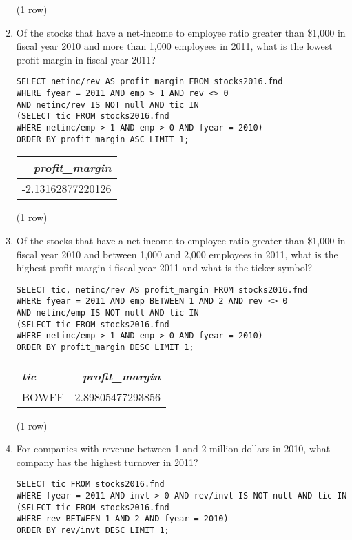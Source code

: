 \documentclass[]{article}
\newenvironment{question}[2][Question]{\begin{trivlist}
\item[\hskip \labelsep {\bfseries #1}\hskip \labelsep {\bfseries #2.}]}{\end{trivlist}}
\begin{document}
\begin{question}{2}
\begin{enumerate}[label=(\alph*)]
\begin{center}
\noindent (1 row) \\
\end{center}

\item Of the stocks that have a net-income to employee ratio greater than \$1,000 in fiscal year 2010 and more than 1,000 employees in 2011, what is the lowest profit margin in fiscal year 2011?
  \color{blue}
\begin{verbatim}
SELECT netinc/rev AS profit_margin FROM stocks2016.fnd
WHERE fyear = 2011 AND emp > 1 AND rev <> 0
AND netinc/rev IS NOT null AND tic IN
(SELECT tic FROM stocks2016.fnd
WHERE netinc/emp > 1 AND emp > 0 AND fyear = 2010)
ORDER BY profit_margin ASC LIMIT 1;
  \end{verbatim}
\color{black}

\begin{center}
\begin{tabular}{r}
\textit{profit\_margin} \\
\hline
-2.13162877220126 \\
\end{tabular}

\noindent (1 row) \\
\end{center}

\item Of the stocks that have a net-income to employee ratio greater than \$1,000 in fiscal year 2010 and between 1,000 and 2,000 employees in 2011, what is the highest profit margin i fiscal year 2011 and what is the ticker symbol?
  \color{blue}
\begin{verbatim}
SELECT tic, netinc/rev AS profit_margin FROM stocks2016.fnd
WHERE fyear = 2011 AND emp BETWEEN 1 AND 2 AND rev <> 0
AND netinc/emp IS NOT null AND tic IN
(SELECT tic FROM stocks2016.fnd
WHERE netinc/emp > 1 AND emp > 0 AND fyear = 2010)
ORDER BY profit_margin DESC LIMIT 1;
  \end{verbatim}
\color{black}

\begin{center}
\begin{tabular}{l | r}
\textit{tic} & \textit{profit\_margin} \\
\hline
BOWFF & 2.89805477293856 \\
\end{tabular}

\noindent (1 row) \\
\end{center}

\item For companies with revenue between 1 and 2 million dollars in 2010, what company has the highest turnover in 2011?
  \color{blue}
\begin{verbatim}
SELECT tic FROM stocks2016.fnd
WHERE fyear = 2011 AND invt > 0 AND rev/invt IS NOT null AND tic IN
(SELECT tic FROM stocks2016.fnd
WHERE rev BETWEEN 1 AND 2 AND fyear = 2010)
ORDER BY rev/invt DESC LIMIT 1;
  \end{verbatim}
\color{black}


\end{enumerate}
\end{question}
\end{document}
